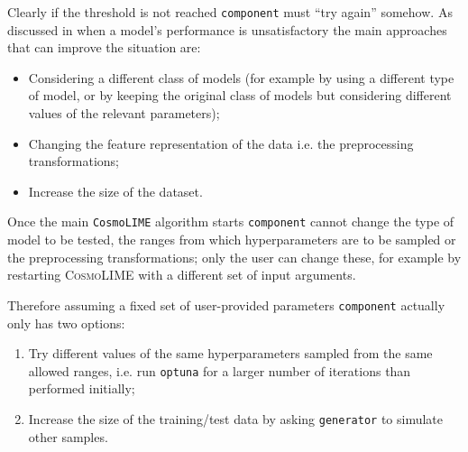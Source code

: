 Clearly if the threshold is not reached \texttt{component} must ``try again'' somehow. As discussed in \cite{understanding_ml} when a model's performance is unsatisfactory the main approaches that can improve the situation are:
\begin{itemize}
    \item Considering a different class of models (for example by using a different type of model, or by keeping the original class of models but considering different values of the relevant parameters);
    \item Changing the feature representation of the data i.e. the preprocessing transformations;
    \item Increase the size of the dataset.
\end{itemize}
Once the main \texttt{CosmoLIME} algorithm starts \texttt{component} cannot change the type of model to be tested, the ranges from which hyperparameters are to be sampled or the preprocessing transformations; only the user can change these, for example by restarting \textsc{CosmoLIME} with a different set of input arguments.

Therefore assuming a fixed set of user-provided parameters \texttt{component} actually only has two options:
\begin{enumerate}
    \item Try different values of the same hyperparameters sampled from the same allowed ranges, i.e. run \texttt{optuna} for a larger number of iterations than performed initially;
    \item Increase the size of the training/test data by asking \texttt{generator} to simulate other samples.
\end{enumerate}

